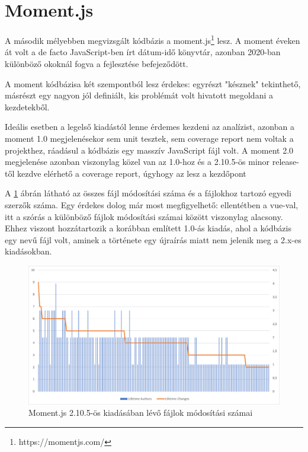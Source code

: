 \section{Moment.js}

A második mélyebben megvizsgált kódbázis a moment.js\footnote{https://momentjs.com/} lesz. A moment éveken át volt a de facto JavaScript-ben írt dátum-idő könyvtár, azonban 2020-ban különböző okoknál fogva a fejlesztése befejeződött.

A moment kódbázisa két szempontból lesz érdekes: egyrészt "késznek" tekinthető, másrészt egy nagyon jól definiált, kis problémát volt hivatott megoldani a kezdetekből.

Ideális esetben a legelső kiadástól lenne érdemes kezdeni az analízist, azonban a moment 1.0 megjelenésekor sem unit tesztek, sem coverage report nem voltak a projekthez, ráadásul a kódbázis egy masszív JavaScript fájl volt. A moment 2.0 megjelenése azonban viszonylag közel van az 1.0-hoz és a 2.10.5-ös minor release-től kezdve elérhető a coverage report, úgyhogy az lesz a kezdőpont

A \ref{fig:moment-2.10.1-changes} ábrán látható az összes fájl módosítási száma és a fájlokhoz tartozó egyedi szerzők száma. Egy érdekes dolog már most megfigyelhető: ellentétben a vue-val, itt a szórás a különböző fájlok módosítási számai között viszonylag alacsony. Ehhez viszont hozzátartozik a korábban említett 1.0-ás kiadás, ahol a kódbázis egy  nevű fájl volt, aminek a története egy újraírás miatt nem jelenik meg a 2.x-es kiadásokban.

\begin{figure}[H]
    \centering
    \includegraphics[width=1\textwidth]{images/moment/moment-2.10.5-changes.png}
    \caption{Moment.js 2.10.5-ös kiadásában lévő fájlok módosítási számai}
    \label{fig:moment-2.10.1-changes}
\end{figure}

